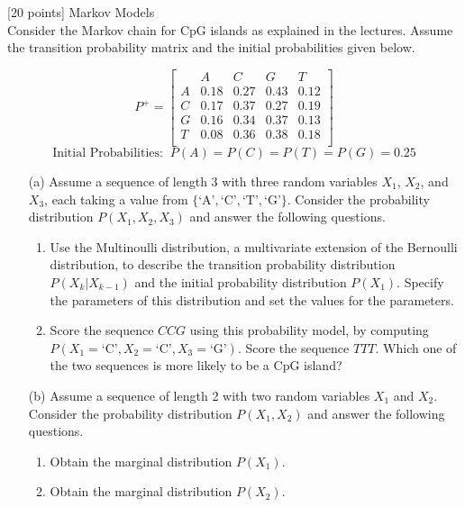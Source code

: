 [20 points] Markov Models\\


Consider the Markov chain for CpG islands as explained in the lectures. Assume the transition probability matrix and the initial probabilities given below.

\[
P^+ = 
\begin{bmatrix}
    & A & C & G & T \\
A & 0.18 & 0.27 & 0.43 & 0.12 \\
C & 0.17 & 0.37 & 0.27 & 0.19 \\
G & 0.16 & 0.34 & 0.37 & 0.13 \\
T & 0.08 & 0.36 & 0.38 & 0.18 \\
\end{bmatrix}
\]
\[
\text{Initial Probabilities:}\;\; P(A)=P(C)=P(T)=P(G)=0.25
\]

\begin{enumerate}
    \item[(a)] Assume a sequence of length 3 with three random variables \(X_1\), \(X_2\), and \(X_3\), each taking a value from \(\{\text{`A'}, \text{`C'}, \text{`T'}, \text{`G'} \}\). Consider the probability distribution \(P(X_1, X_2, X_3)\) and answer the following questions.
    \begin{enumerate}
        \item Use the Multinoulli distribution, a multivariate extension of the Bernoulli distribution, to describe the transition probability distribution \(P(X_k|X_{k-1})\) and the initial probability distribution \(P(X_1)\). Specify the parameters of this distribution and set the values for the parameters.
        
        \item Score the sequence \(CCG\) using this probability model, by computing \(P(X_1 = \text{`C'}, X_2 = \text{`C'}, X_3 = \text{`G'})\). Score the sequence \(TTT\). Which one of the two sequences is more likely to be a CpG island?\\
    \end{enumerate}

    \item[(b)] Assume a sequence of length 2 with two random variables \(X_1\) and \(X_2\). Consider the probability distribution \(P(X_1, X_2)\) and answer the following questions.
    \begin{enumerate}
        \item Obtain the marginal distribution \(P(X_1)\).
        
        \item Obtain the marginal distribution \(P(X_2)\).
    \end{enumerate}
\end{enumerate}


